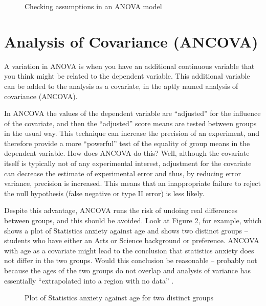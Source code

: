 \begin{figure}[!htb]
\begin{center}
\caption{Checking assumptions in an ANOVA model}
\label{fig:factorialanova5}
\HR
\end{center}
\end{figure}


\section{Analysis of Covariance (ANCOVA)\label{sec:ancova}}

A variation in ANOVA is when you have an additional continuous variable that you think might be related to the dependent variable. This additional variable can be added to the analysis as a covariate, in the aptly named analysis of covariance (ANCOVA).

In ANCOVA the values of the dependent variable are “adjusted” for the influence of the covariate, and then the “adjusted” score means are tested between groups in the usual way. This technique can increase the precision of an experiment, and therefore provide a more “powerful” test of the equality of group means in the dependent variable. How does ANCOVA do this? Well, although the covariate itself is typically not of any experimental interest, adjustment for the covariate can decrease the estimate of experimental error and thus, by reducing error variance, precision is increased. This means that an inappropriate failure to reject the null hypothesis (false negative or type II error) is less likely. 

Despite this advantage, ANCOVA runs the risk of undoing real differences between groups, and this should be avoided. Look at Figure \ref{fig:ancova_groups}, for example, which shows a plot of Statistics anxiety against age and shows two distinct groups – students who have either an Arts or Science background or preference. ANCOVA with age as a covariate might lead to the conclusion that statistics anxiety does not differ in the two groups. Would this conclusion be reasonable – probably not because the ages of the two groups do not overlap and analysis of variance has essentially “extrapolated into a region with no data” \parencite[68]{Everitt1996}. 

\begin{figure}[!htb]
\begin{center}
\caption{Plot of Statistics anxiety against age for two distinct groups}
\label{fig:ancova_groups}
\HR
\end{center}
\end{figure}


